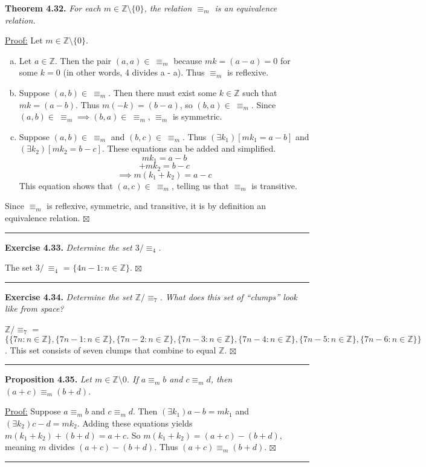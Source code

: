 \documentclass[a4paper,12pt]{article}
\newcommand{\entry}[3]
{
   \noindent\textbf{#1.}
   \emph{#2}
   \bigskip

   \noindent#3
   \bigskip
   \hrule
   \vspace{24pt}
}
\newcommand{\sig}{$\boxtimes$}
\begin{document}
\entry{Theorem 4.32}
{For each $m \in \mathbb{Z} \setminus \{0\}$, the relation $\equiv_m$ is an equivalence relation.}
{
\underline{Proof:} Let $m \in \mathbb{Z} \setminus \{0\}$. 
\begin{enumerate}[(a)]
\item
Let $a \in \mathbb{Z}$. Then the pair $(a, a) \in~\equiv_m$ because $mk = (a - a) = 0$ for some $k = 0$ (in other words, 4 divides a - a). Thus $\equiv_m$ is reflexive.
\item
Suppose $(a, b) \in~\equiv_m$. Then there must exist some $k \in \mathbb{Z}$ such that $mk = (a -b)$. Thus $m(-k) = (b - a)$, so $(b, a) \in~\equiv_m$. Since $(a, b) \in~\equiv_m \implies (b, a) \in~\equiv_m$, $\equiv_m$ is symmetric.
\item
Suppose $(a, b) \in~\equiv_m$ and $(b, c) \in~\equiv_m$. Thus $(\exists k_1)[mk_1 = a - b]$ and $(\exists k_2)[mk_2 = b - c]$. These equations can be added and simplified.
\[ mk_1 = a - b \]
\[ + mk_2 = b - c \]
\[ \implies m(k_1 + k_2) = a - c \]
This equation shows that $(a, c) \in~\equiv_m$, telling us that $\equiv_m$ is transitive.
\end{enumerate}
Since $\equiv_m$ is reflexive, symmetric, and transitive, it is by definition an equivalence relation. \sig
}



\entry{Exercise 4.33}
{Determine the set $3/\equiv_4$.}
{The set $3/~\equiv_4$ = $\{ 4n - 1 : n \in \mathbb{Z} \}$. \sig}



\entry{Exercise 4.34}
{Determine the set $\mathbb{Z}/\equiv_7$. What does this set of ``clumps'' look like from space?}
{$\mathbb{Z}/\equiv_7$ = $\{ \{ 7n : n \in \mathbb{Z} \}, \{ 7n - 1 : n \in \mathbb{Z} \}, \{ 7n - 2 : n \in \mathbb{Z} \}, \{ 7n - 3 : n \in \mathbb{Z} \}, \{ 7n - 4 : n \in \mathbb{Z} \}, \{ 7n - 5 : n \in \mathbb{Z} \}, \{ 7n - 6 : n \in \mathbb{Z} \} \}$. This set consists of seven clumps that combine to equal $\mathbb{Z}$. \sig}



\entry{Proposition 4.35}
{Let $m \in \mathbb{Z} \setminus {0}$. If $a \equiv_m b$ and $c \equiv_m d$, then $(a + c) \equiv_m (b + d)$.}
{
\underline{Proof:} Suppose $a \equiv_m b$ and $c \equiv_m d$. Then $(\exists k_1) a - b = mk_1$ and $(\exists k_2) c - d = mk_2$. Adding these equations yields $m(k_1 + k_2) + (b + d) = a + c$. So $m(k_1 + k_2) = (a + c) - (b + d)$, meaning $m$ divides $(a + c) - (b + d)$. Thus $(a + c) \equiv_m (b + d)$. \sig
}
\end{document}
